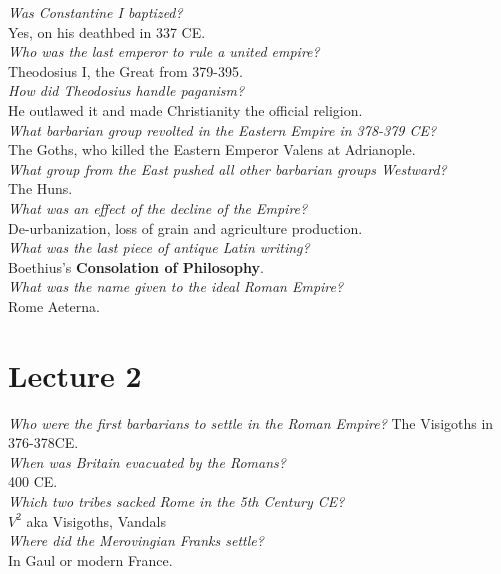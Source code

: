 \documentclass[12pt]{article}
\begin{document}
\textit{Was Constantine I baptized?}\\
Yes, on his deathbed in 337 CE.\\

\textit{Who was the last emperor to rule a united empire?}\\
Theodosius I, the Great from 379-395.\\

\textit{How did Theodosius handle paganism?}\\
He outlawed it and made Christianity the official religion.\\

\textit{What barbarian group revolted in the Eastern Empire in 378-379 CE?}\\
The Goths, who killed the Eastern Emperor Valens at Adrianople.\\

\textit{What group from the East pushed all other barbarian groups Westward?}\\
The Huns.\\

\textit{What was an effect of the decline of the Empire?}\\
De-urbanization, loss of grain and agriculture production.\\

\textit{What was the last piece of antique Latin writing?}\\
Boethius's \textbf{Consolation of Philosophy}.\\

\textit{What was the name given to the ideal Roman Empire?}\\
Rome Aeterna.

\section*{Lecture 2}
\setlength{\parindent}{0pt}

\textit{Who were the first barbarians to settle in the Roman Empire?}
The Visigoths in 376-378CE.\\

\textit{When was Britain evacuated by the Romans?}\\
400 CE.\\

\textit{Which two tribes sacked Rome in the 5th Century CE?}\\
$V^{2}$ aka Visigoths, Vandals\\

\textit{Where did the Merovingian Franks settle?}\\
In Gaul or modern France.\\
\end{document}
